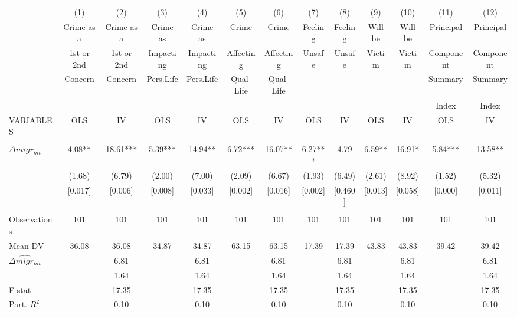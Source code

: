 \begin{tabular}{lcccccccccccc} \hline
 & (1) & (2) & (3) & (4) & (5) & (6) & (7) & (8) & (9) & (10) & (11) & (12) \\
 & Crime as a & Crime as a & Crime as & Crime as & Crime & Crime & Feeling & Feeling & Will be & Will be & Principal & Principal \\
 & 1st or 2nd & 1st or 2nd & Impacting & Impacting & Affecting & Affecting & Unsafe & Unsafe & Victim & Victim & Component & Component \\
 & Concern & Concern & Pers.Life & Pers.Life & Qual-Life & Qual-Life &  &  &  &  & Summary & Summary \\
 &  &  &  &  &  &  &  &  &  &  & Index & Index \\
VARIABLES & OLS & IV & OLS & IV & OLS & IV & OLS & IV & OLS & IV & OLS & IV \\ \hline
 &  &  &  &  &  &  &  &  &  &  &  &  \\
$\Delta migr_{mt}$ & 4.08** & 18.61*** & 5.39*** & 14.94** & 6.72*** & 16.07** & 6.27*** & 4.79 & 6.59** & 16.91* & 5.84*** & 13.58** \\
 & (1.68) & (6.79) & (2.00) & (7.00) & (2.09) & (6.67) & (1.93) & (6.49) & (2.61) & (8.92) & (1.52) & (5.32) \\
 & [0.017] & [0.006] & [0.008] & [0.033] & [0.002] & [0.016] & [0.002] & [0.460] & [0.013] & [0.058] & [0.000] & [0.011] \\
 &  &  &  &  &  &  &  &  &  &  &  &  \\
Observations & 101 & 101 & 101 & 101 & 101 & 101 & 101 & 101 & 101 & 101 & 101 & 101 \\
Mean DV & 36.08 & 36.08 & 34.87 & 34.87 & 63.15 & 63.15 & 17.39 & 17.39 & 43.83 & 43.83 & 39.42 & 39.42 \\
$ \widehat{\Delta migr_{mt}} $ &  & 6.81 &  & 6.81 &  & 6.81 &  & 6.81 &  & 6.81 &  & 6.81 \\
\hspace{1cm} &  & 1.64 &  & 1.64 &  & 1.64 &  & 1.64 &  & 1.64 &  & 1.64 \\
F-stat &  & 17.35 &  & 17.35 &  & 17.35 &  & 17.35 &  & 17.35 &  & 17.35 \\
 Part. $ R^2 $ &  & 0.10 &  & 0.10 &  & 0.10 &  & 0.10 &  & 0.10 &  & 0.10 \\ \hline
\end{tabular}
